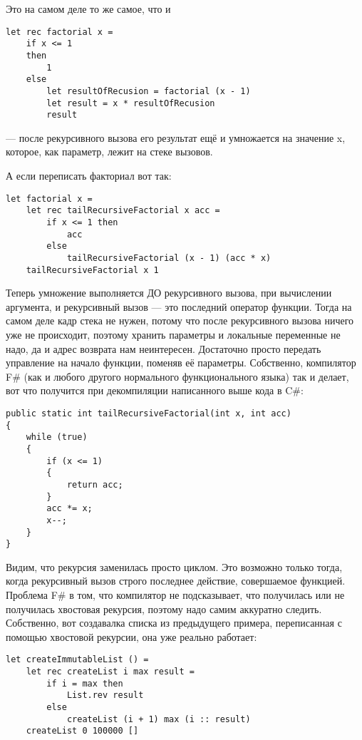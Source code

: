 \documentclass[a5paper]{article}
\begin{document}
Это на самом деле то же самое, что и 

\begin{verbatim}
let rec factorial x =
    if x <= 1
    then
        1
    else
        let resultOfRecusion = factorial (x - 1)
        let result = x * resultOfRecusion
        result
\end{verbatim}

--- после рекурсивного вызова его результат ещё и умножается на значение x, которое, как параметр, лежит на стеке вызовов.

А если переписать факториал вот так:

\begin{verbatim}
let factorial x =
    let rec tailRecursiveFactorial x acc =
        if x <= 1 then
            acc
        else
            tailRecursiveFactorial (x - 1) (acc * x)
    tailRecursiveFactorial x 1
\end{verbatim}

Теперь умножение выполняется ДО рекурсивного вызова, при вычислении аргумента, и рекурсивный вызов --- это последний оператор функции. Тогда на самом деле кадр стека не нужен, потому что после рекурсивного вызова ничего уже не происходит, поэтому хранить параметры и локальные переменные не надо, да и адрес возврата нам неинтересен. Достаточно просто передать управление на начало функции, поменяв её параметры. Собственно, компилятор F\# (как и любого другого нормального функционального языка) так и делает, вот что получится при декомпиляции написанного выше кода в C\#:

\begin{verbatim}
public static int tailRecursiveFactorial(int x, int acc)
{
    while (true)
    {
        if (x <= 1)
        {
            return acc;
        }
        acc *= x;
        x--;
    }
}
\end{verbatim}

Видим, что рекурсия заменилась просто циклом. Это возможно только тогда, когда рекурсивный вызов строго последнее действие, совершаемое функцией. Проблема F\# в том, что компилятор не подсказывает, что получилась или не получилась хвостовая рекурсия, поэтому надо самим аккуратно следить. Собственно, вот создавалка списка из предыдущего примера, переписанная с помощью хвостовой рекурсии, она уже реально работает:

\begin{verbatim}
let createImmutableList () =
    let rec createList i max result =
        if i = max then
            List.rev result
        else
            createList (i + 1) max (i :: result)
    createList 0 100000 []
\end{verbatim}
\end{document}
